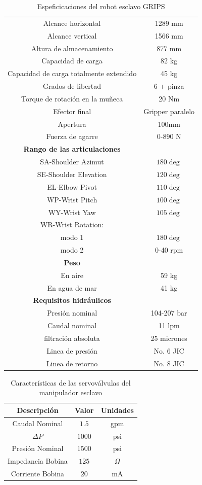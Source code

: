 \begin{table}
  \centering
\caption{Espeficicaciones del robot esclavo GRIPS}
\label{tab:espgrips}
\begin{tabular}{c c}
\hline
Alcance horizontal & 1289 mm\\
Alcance vertical & 1566 mm\\
Altura de almacenamiento & 877 mm\\
Capacidad de carga & 82 kg\\
Capacidad de carga totalmente extendido & 45 kg\\
Grados de libertad & 6 + pinza\\
Torque de rotación en la muñeca & 20 Nm \\
Efector final & Gripper paralelo\\
Apertura & 100mm\\
Fuerza de agarre & 0-890 N\\
\textbf{Rango de las articulaciones} \\
SA-Shoulder Azimut & $180 \deg$\\
SE-Shoulder Elevation & $120 \deg$\\
EL-Elbow Pivot & $110 \deg$\\
WP-Wrist Pitch & $100 \deg$\\
WY-Wrist Yaw & $105 \deg$\\
WR-Wrist Rotation: \\
modo 1 & $180 \deg$\\
modo 2 & 0-40 rpm\\
\textbf{Peso}\\
En aire & 59 kg\\
En agua de mar & 41 kg\\
\textbf{Requisitos hidráulicos}\\
Presión nominal & 104-207 bar\\
Caudal nominal & 11 lpm\\
filtración absoluta & 25 micrones\\
Linea de presión & No.  6 JIC\\
Linea de retorno & No.  8 JIC\\
\hline
\end{tabular}
\end{table}




\begin{table}[htbp]
  \centering
  \caption{Características de las servoválvulas del manipulador esclavo}
    \begin{tabular}{ccc}
    \hline
    \textbf{Descripción} & \textbf{Valor} & \textbf{Unidades}\\
    \hline
    Caudal Nominal		& $1.5$		& gpm \\
    $\Delta P$			& $1000$	& psi \\
    Presión Nominal		& $1500$	& psi \\
    Impedancia Bobina	& $125$		& $ \Omega $ \\
    Corriente Bobina	& $20$		& mA \\
    \hline
    \end{tabular}%
  \label{tab:Plat:valves}%
\end{table}%


